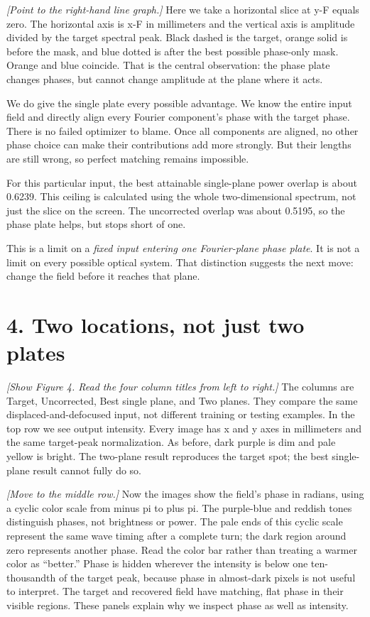 \documentclass[11pt,a4paper]{article}
\newcommand{\cue}[1]{{\small\color{blue!55!black}\textit{[#1]}}}
\newcommand{\asset}[1]{{\small\texttt{\detokenize{#1}}}}
\begin{document}
\cue{Point to the right-hand line graph.}
Here we take a horizontal slice at y-F equals zero. The horizontal axis is x-F in millimeters and the vertical axis is amplitude divided by the target spectral peak. Black dashed is the target, orange solid is before the mask, and blue dotted is after the best possible phase-only mask. Orange and blue coincide. That is the central observation: the phase plate changes phases, but cannot change amplitude at the plane where it acts.

We do give the single plate every possible advantage. We know the entire input field and directly align every Fourier component's phase with the target phase. There is no failed optimizer to blame. Once all components are aligned, no other phase choice can make their contributions add more strongly. But their lengths are still wrong, so perfect matching remains impossible.

For this particular input, the best attainable single-plane power overlap is about 0.6239. This ceiling is calculated using the whole two-dimensional spectrum, not just the slice on the screen. The uncorrected overlap was about 0.5195, so the phase plate helps, but stops short of one.

This is a limit on a \emph{fixed input entering one Fourier-plane phase plate}. It is not a limit on every possible optical system. That distinction suggests the next move: change the field before it reaches that plane.

\newpage
\section*{4. Two locations, not just two plates}
\asset{04_correction_comparison.png}

\cue{Show Figure 4. Read the four column titles from left to right.}
The columns are Target, Uncorrected, Best single plane, and Two planes. They compare the same displaced-and-defocused input, not different training or testing examples. In the top row we see output intensity. Every image has x and y axes in millimeters and the same target-peak normalization. As before, dark purple is dim and pale yellow is bright. The two-plane result reproduces the target spot; the best single-plane result cannot fully do so.

\cue{Move to the middle row.}
Now the images show the field's phase in radians, using a cyclic color scale from minus pi to plus pi. The purple-blue and reddish tones distinguish phases, not brightness or power. The pale ends of this cyclic scale represent the same wave timing after a complete turn; the dark region around zero represents another phase. Read the color bar rather than treating a warmer color as ``better.'' Phase is hidden wherever the intensity is below one ten-thousandth of the target peak, because phase in almost-dark pixels is not useful to interpret. The target and recovered field have matching, flat phase in their visible regions. These panels explain why we inspect phase as well as intensity.
\end{document}
